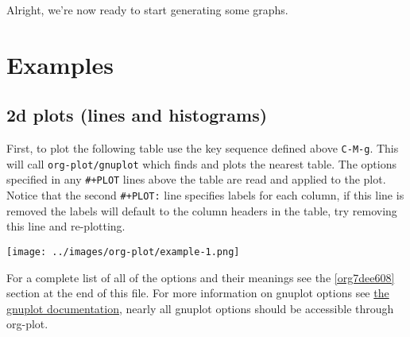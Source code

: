 \documentclass[11pt]{article}
\begin{document}
Alright, we're now ready to start generating some graphs.

\section*{Examples}
\label{sec:org19ce8f2}
\subsection*{2d plots (lines and histograms)}
\label{sec:orgcf83c4b}

First, to plot the following table use the key sequence defined above
\texttt{C-M-g}.  This will call \texttt{org-plot/gnuplot} which finds and plots the
nearest table.  The options specified in any \texttt{\#+PLOT} lines above the
table are read and applied to the plot.  Notice that the second
\texttt{\#+PLOT:} line specifies labels for each column, if this line is
removed the labels will default to the column headers in the table,
try removing this line and re-plotting.

\begin{center}
\texttt{[image: ../images/org-plot/example-1.png]}
\end{center}

For a complete list of all of the options and their meanings see the
\ref{org7dee608} section at the end of this file.  For more information on
gnuplot options see \href{http://gnuplot.sourceforge.net/documentation.html}{the gnuplot documentation}, nearly all gnuplot
options should be accessible through org-plot.
\end{document}
